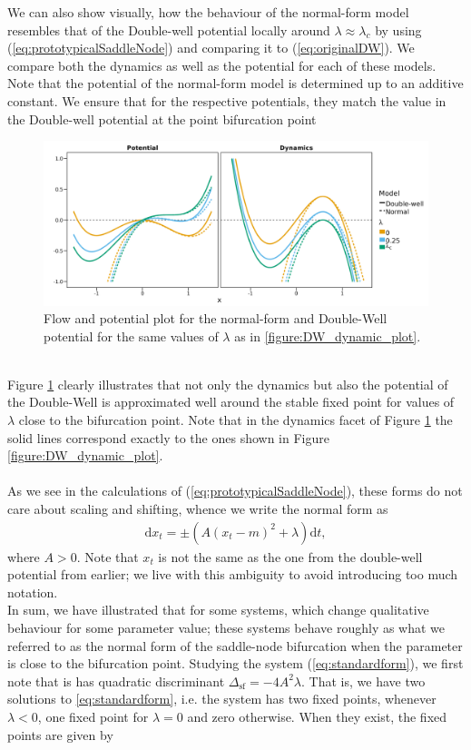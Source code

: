 We can also show visually, how the behaviour of the normal-form model resembles that of the Double-well potential locally around $\lambda \approx \lambda_c$ by using (\ref{eq:prototypicalSaddleNode}) and comparing it to (\ref{eq:originalDW}). We compare both the dynamics as well as the potential for each of these models. Note that the potential of the normal-form model is determined up to an additive constant. We ensure that for the respective potentials, they match the value in the Double-well potential at the point bifurcation point
\begin{figure}[h!]
    \begin{center}
        \includegraphics[scale = .1]{figures/potential_dynamic_plot.jpeg}
        \caption{Flow and potential plot for the normal-form and Double-Well potential for the same values of $\lambda$ as in \ref{figure:DW_dynamic_plot}.}
        \label{figure:DW_and_Normal_potential_and_dynamic_plot}
    \end{center}
\end{figure}\\
Figure \ref{figure:DW_and_Normal_potential_and_dynamic_plot} clearly illustrates that not only the dynamics but also the potential of the Double-Well is approximated well around the stable fixed point for values of $\lambda$ close to the bifurcation point. Note that in the dynamics facet of Figure \ref{figure:DW_and_Normal_potential_and_dynamic_plot} the solid lines correspond exactly to the ones shown in Figure \ref{figure:DW_dynamic_plot}.\\\\
As we see in the calculations of (\ref{eq:prototypicalSaddleNode}), these forms do not care about scaling and shifting, whence we write the normal form as
\begin{align}
    \mathrm{d}x_t = \pm\left(A\left(x_t - m\right)^2 + \lambda\right)\mathrm{d}t, \label{eq:standardform}
\end{align}
where $A>0$. Note that $x_t$ is not the same as the one from the double-well potential from earlier; we live with this ambiguity to avoid introducing too much notation.\\ In sum, we have illustrated that for some systems, which change qualitative behaviour for some parameter value; these systems behave roughly as what we referred to as the normal form of the saddle-node bifurcation when the parameter is close to the bifurcation point. Studying the system (\ref{eq:standardform}), we first note that is has quadratic discriminant $\Delta_{\mathrm{sf}} = -4A^2\lambda$. That is, we have two solutions to \ref{eq:standardform}, i.e. the system has two fixed points, whenever $\lambda<0$, one fixed point for $\lambda = 0$ and zero otherwise. When they exist, the fixed points are given by
